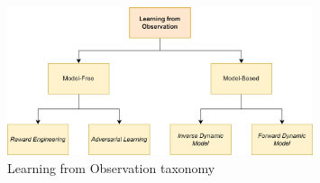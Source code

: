 \begin{figure}[t]
    \centering
    \includegraphics[width=0.8\textwidth]{figures/images/lfo_taxonomy.jpg}
    \caption{Learning from Observation taxonomy}
    \label{fig:lfo_taxonomy}
    
\end{figure}
